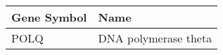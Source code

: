 \begin{tabular}{ll}
\toprule
Gene Symbol &                 Name \\
\midrule
       POLQ & DNA polymerase theta \\
\bottomrule
\end{tabular}
